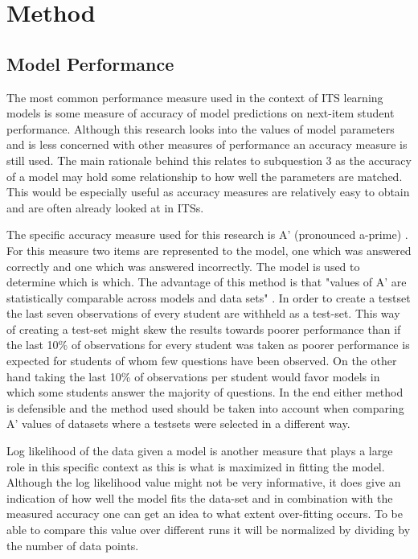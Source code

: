 \documentclass{scrartcl}
\begin{document}
\section{Method}


\subsection{Model Performance}

\label{sec:perf}
The most common performance measure used in the context of ITS learning models is some measure of accuracy of model predictions on next-item student performance. Although this research looks into the values of model parameters and is less concerned with other measures of performance an accuracy measure is still used. The main rationale behind this relates to subquestion 3 as the accuracy of a model may hold some relationship to how well the parameters are matched. This would be especially useful as accuracy measures are relatively easy to obtain and are often already looked at in ITSs. 

The specific accuracy measure used for this research is A' (pronounced a-prime) \cite{modelreview}. For this measure two items are represented to the model, one which was answered correctly and one which was answered incorrectly. The model is used to determine which is which. The advantage of this method is that "values of A' are statistically comparable across models and data sets" \cite{modelreview}. In order to create a testset the last seven observations of every student are withheld as a test-set. This way of creating a test-set might skew the results towards poorer performance than if the last 10\% of observations for every student was taken as poorer performance is expected for students of whom few questions have been observed. On the other hand taking the last 10\% of observations per student would favor models in which some students answer the majority of questions. In the end either method is defensible and the method used should be taken into account when comparing A' values of datasets where a testsets were selected in a different way.

Log likelihood of the data given a model is another measure that plays a large role in this specific context as this is what is maximized in fitting the model. Although the log likelihood value might not be very informative, it does give an indication of how well the model fits the data-set and in combination with the measured accuracy one can get an idea to what extent over-fitting occurs. To be able to compare this value over different runs it will be normalized by dividing by the number of data points.
\end{document}
